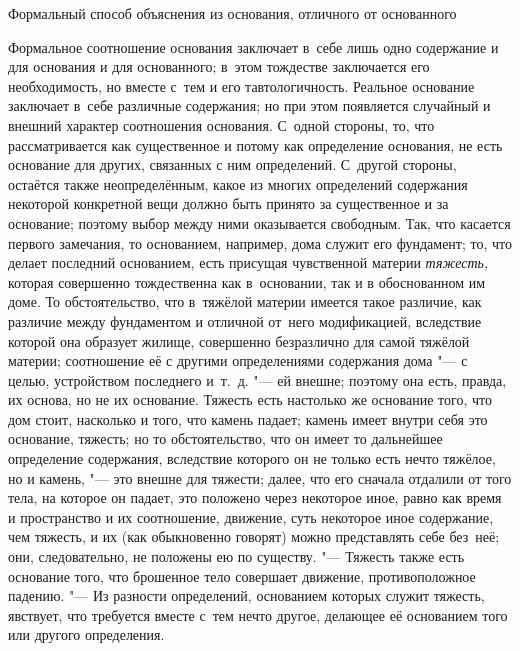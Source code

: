 \subsubremark%
{Формальный способ объяснения из основания, отличного от основанного}

Формальное соотношение основания заключает в~себе лишь одно содержание и для
основания и для основанного; в~этом тождестве заключается его необходимость,
но вместе с~тем и его тавтологичность. Реальное основание заключает в~себе
различные содержания; но при этом появляется случайный и внешний характер
соотношения основания. С~одной стороны, то, что рассматривается как
существенное и потому как определение основания, не есть основание для других,
связанных с ним определений. С~другой стороны, остаётся также неопределённым,
какое из многих определений содержания некоторой конкретной вещи должно быть
принято за существенное и за основание; поэтому выбор между ними оказывается
свободным. Так, что касается первого замечания, то основанием, например, дома
служит его фундамент; то, что делает последний основанием, есть присущая
чувственной материи {\em тяжесть,} которая совершенно тождественна как
в~основании, так и в обоснованном им доме. То обстоятельство, что в~тяжёлой
материи имеется такое различие, как различие между фундаментом и отличной
от~него модификацией, вследствие которой она образует жилище, совершенно
безразлично для самой тяжёлой материи; соотношение её с другими определениями
содержания дома "--- с целью, устройством последнего и~т.~д. "--- ей внешне;
поэтому она есть, правда, их основа, но не их основание. Тяжесть есть настолько
же основание того, что дом стоит, насколько и того, что камень падает; камень
имеет внутри себя это основание, тяжесть; но то обстоятельство, что он имеет то
дальнейшее определение содержания, вследствие которого он не только есть нечто
тяжёлое, но и камень, "--- это внешне для тяжести; далее, что его сначала
отдалили от того тела, на которое он падает, это положено через некоторое
иное, равно как время и пространство и их соотношение, движение, суть
некоторое иное содержание, чем тяжесть, и их (как обыкновенно говорят) можно
представлять себе без~неё; они, следовательно, не положены ею по существу. "---
Тяжесть также есть основание того, что брошенное тело совершает движение,
противоположное падению. "--- Из разности определений, основанием которых
служит тяжесть, явствует, что требуется вместе с~тем нечто другое, делающее
её основанием того или другого определения.

